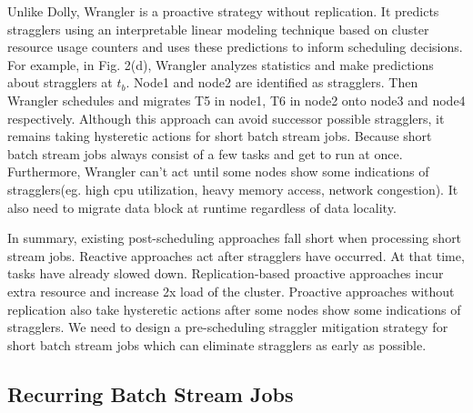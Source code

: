   Unlike Dolly, Wrangler \cite{Yadwadkar2014} is a proactive strategy without replication. It predicts stragglers using an interpretable linear modeling technique based on cluster resource usage counters and uses these predictions to inform scheduling decisions. For example, in Fig. 2(d), Wrangler analyzes statistics and make predictions about stragglers at $t_b$. Node1 and node2 are identified as stragglers. Then Wrangler schedules and migrates T5 in node1, T6 in node2 onto node3 and node4 respectively. Although this approach can avoid successor possible stragglers, it remains taking hysteretic actions for short batch stream jobs. Because short batch stream jobs always consist of a few tasks and get to run at once. Furthermore, Wrangler can't act until some nodes show some indications of stragglers(eg. high cpu utilization, heavy memory access, network congestion). It also need to migrate data block at runtime regardless of data locality.

  In summary, existing post-scheduling approaches fall short when processing short stream jobs. Reactive approaches act after stragglers have occurred. At that time, tasks have already slowed down. Replication-based proactive approaches incur extra resource and increase 2x load of the cluster. Proactive approaches without replication also take hysteretic actions after some nodes show some indications of stragglers. We need to design a pre-scheduling straggler mitigation strategy for short batch stream jobs which can eliminate stragglers as early as possible.

\subsection{Recurring Batch Stream Jobs}

